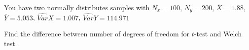 
\begin{question}
You have two normally distributes samples with \(N_x=100\), \(N_y=200\), \(\overline{X} = 1.88\), \(\overline{Y} = 5.053\), \(\widehat{Var}{X} = 1.007\), \(\widehat{Var}{Y} = 114.971\)

Find the difference between number of degrees of freedom for \(t\)-test and Welch test.
\end{question}


